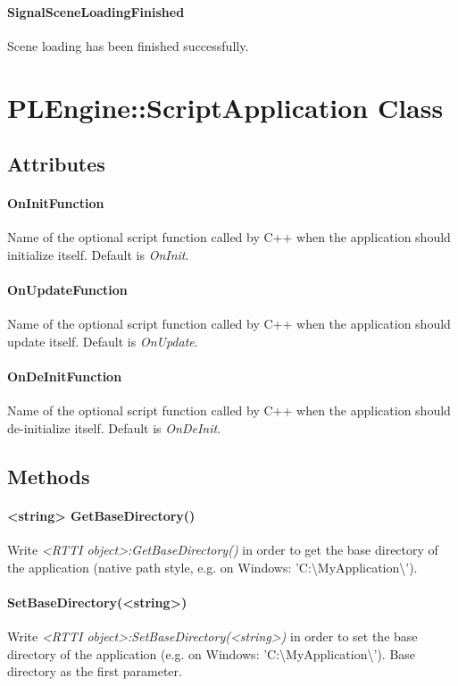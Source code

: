 \paragraph{SignalSceneLoadingFinished}
Scene loading has been finished successfully.




\section{PLEngine::ScriptApplication Class}


\subsection{Attributes}

\paragraph{OnInitFunction}
Name of the optional script function called by C++ when the application should initialize itself. Default is \emph{OnInit}.

\paragraph{OnUpdateFunction}
Name of the optional script function called by C++ when the application should update itself. Default is \emph{OnUpdate}.

\paragraph{OnDeInitFunction}
Name of the optional script function called by C++ when the application should de-initialize itself. Default is \emph{OnDeInit}.


\subsection{Methods}

\paragraph{<string> GetBaseDirectory()}
Write \emph{<RTTI object>:GetBaseDirectory()} in order to get the base directory of the application (native path style, e.g. on Windows: 'C:\textbackslash MyApplication\textbackslash ').

\paragraph{SetBaseDirectory(<string>)}
Write \emph{<RTTI object>:SetBaseDirectory(<string>)} in order to set the base directory of the application (e.g. on Windows: 'C:\textbackslash MyApplication\textbackslash '). Base directory as the first parameter.

